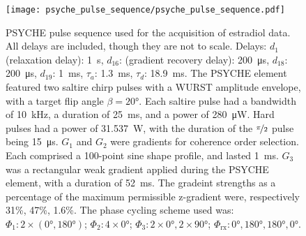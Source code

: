 \begin{figure}[H]
    \centering
    \texttt{[image: psyche\_pulse\_sequence/psyche\_pulse\_sequence.pdf]}
    \caption[
        \acs{PSYCHE} pulse sequence used for the acquisition of estradiol data.
    ]{
        \acs{PSYCHE} pulse sequence used for the acquisition of estradiol data. All
        delays are included, though they are not to scale.
        Delays:
        $d_1$ (relaxation delay): \qty{1}{\second},
        $d_{16}$: (gradient recovery delay): \qty{200}{\micro\second},
        $d_{18}$: \qty{200}{\micro\second},
        $d_{19}$: \qty{1}{\milli\second},
        $\tau_a$: \qty{1.3}{\milli\second},
        $\tau_d$: \qty{18.9}{\milli\second}.
        The \ac{PSYCHE} element featured two saltire chirp pulses with a
        \ac{WURST}\cite{ODell2013}
        amplitude envelope, with a target flip angle $\beta = \ang{20}$.
        Each saltire pulse
        had a bandwidth of \qty{10}{\kilo\hertz},
        a duration of \qty{25}{\milli\second},
        and a power of \qty{280}{\micro\watt}.
        Hard pulses
        had a power of \qty{31.537}{\watt},
        with the duration of the $\nicefrac{\pi}{2}$ pulse being \qty{15}{\micro\second}.
        $G_1$ and $G_2$ were gradients for coherence order selection.
        Each comprised a 100-point sine shape profile, and lasted
        \qty{1}{\milli\second}.
        $G_3$ was a rectangular weak gradient applied during the PSYCHE
        element, with a duration of \qty{52}{\milli\second}.
        The gradeint strengths as a percentage of the maximum permissible
        z-gradient were, respectively 31\%, 47\%, 1.6\%.
        The phase cycling scheme used was:
        $\Phi_1: 2 \times (\ang{0}, \ang{180})$;
        $\Phi_2: 4 \times \ang{0}$;
        $\Phi_3: 2 \times \ang{0}, 2 \times \ang{90}$;
        $\Phi_{\text{rx}}: \ang{0}, \ang{180}, \ang{180}, \ang{0}$.
    }
    \label{fig:psyche}
\end{figure}

